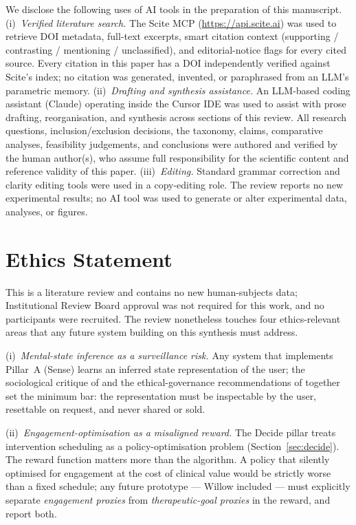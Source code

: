 \documentclass[10pt,conference]{article}
\newcommand{\secref}[1]{Section~\ref{#1}}
\begin{document}
We disclose the following uses of AI tools in the preparation of this
manuscript.
(i)~\textit{Verified literature search.} The Scite MCP
(\url{https://api.scite.ai}) was used to retrieve DOI metadata,
full-text excerpts, smart citation context
(supporting / contrasting / mentioning / unclassified), and
editorial-notice flags for every cited source. Every citation in this
paper has a DOI independently verified against Scite's index; no
citation was generated, invented, or paraphrased from an LLM's
parametric memory.
(ii)~\textit{Drafting and synthesis assistance.} An LLM-based coding
assistant (Claude) operating inside the Cursor IDE was used to assist
with prose drafting, reorganisation, and synthesis across sections of
this review. All research questions, inclusion/exclusion decisions,
the taxonomy, claims, comparative analyses, feasibility judgements,
and conclusions were authored and verified by the human author(s),
who assume full responsibility for the scientific content and
reference validity of this paper.
(iii)~\textit{Editing.} Standard grammar correction and clarity
editing tools were used in a copy-editing role.
The review reports no new experimental results; no AI tool was used
to generate or alter experimental data, analyses, or figures.

\section{Ethics Statement}\label{sec:ethics-statement}

This is a literature review and contains no new human-subjects data;
Institutional Review Board approval was not required for this work,
and no participants were recruited. The review nonetheless touches
four ethics-relevant areas that any future system building on this
synthesis must address.

(i)~\emph{Mental-state inference as a surveillance risk.} Any system
that implements Pillar~A (Sense) learns an inferred state
representation of the user; the sociological critique of
\cite{BirkSamuel2020DigitalPhenotypingCritique} and the
ethical-governance recommendations of
\cite{MartinezMartin2021DigitalPhenotypingEthics} together set the
minimum bar: the representation must be inspectable by the user,
resettable on request, and never shared or sold.

(ii)~\emph{Engagement-optimisation as a misaligned reward.} The
Decide pillar treats intervention scheduling as a
policy-optimisation problem (\secref{sec:decide}). The reward
function matters more than the algorithm. A policy that silently
optimised for engagement at the cost of clinical value would be
strictly worse than a fixed schedule; any future prototype --- Willow
included --- must explicitly separate \emph{engagement proxies} from
\emph{therapeutic-goal proxies} in the reward, and report both.
\end{document}

